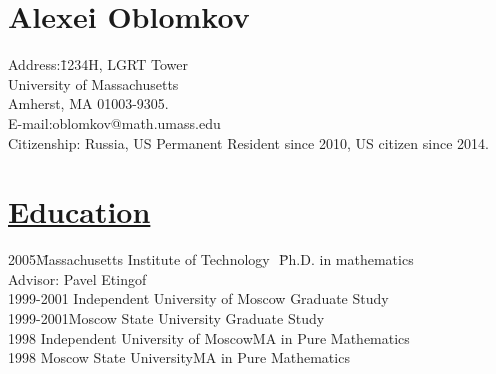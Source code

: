 \documentclass[11pt]{amsart}
\theoremstyle{plain}
\theoremstyle{definition}
\theoremstyle{remark}
\begin{document}
\section*{\bf{\huge Alexei Oblomkov}}
\bigskip



\begin{tabbing}
Address:\quad\quad\quad\;\= 1234H, LGRT Tower\\
                      \>University of Massachusetts\\
\>  Amherst, MA 01003-9305.\\

E-mail:\quad\quad\quad\quad oblomkov@math.umass.edu\\

Citizenship:\> Russia, US Permanent Resident since 2010, US citizen since 2014.
\end{tabbing}








\section*{\Large\underline{Education}}
\begin{tabbing}
2005\quad\quad\quad\quad\quad\= Massachusetts Institute of
Technology   \quad\quad\,\,\:\:\:\:\= Ph.D. in
mathematics\\
\>\quad\quad  \>  Advisor: Pavel Etingof\\
1999-2001\> Independent University of
Moscow\> Graduate Study\\
1999-2001\>Moscow State University\> Graduate Study\\

1998\> Independent University of Moscow\>MA in Pure Mathematics\\
1998\> Moscow State University\>MA in Pure Mathematics
\end{tabbing}
\end{document}
